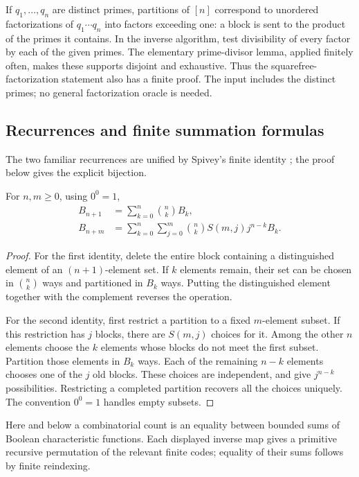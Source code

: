 If $q_1,\ldots,q_n$ are distinct primes, partitions of $[n]$ correspond to
unordered factorizations of $q_1\cdots q_n$ into factors exceeding one: a block
is sent to the product of the primes it contains. In the inverse algorithm,
test divisibility of every factor by each of the given primes. The elementary
prime-divisor lemma, applied finitely often, makes these supports disjoint and
exhaustive. Thus the squarefree-factorization statement also has a finite
proof. The input includes the distinct primes; no general factorization oracle
is needed.

\subsection{Recurrences and finite summation formulas}

The two familiar recurrences are unified by Spivey's finite identity
\cite{spivey}; the proof below gives the explicit bijection.

\begin{theorem}\label{thm:spivey}
For $n,m\geq0$, using $0^0=1$,
\begin{align}
 B_{n+1}&=\sum_{k=0}^{n}\binom nk B_k,\label{eq:bell-binomial}\\
 B_{n+m}&=\sum_{k=0}^{n}\sum_{j=0}^{m}
       \binom nk S(m,j)j^{n-k}B_k.\label{eq:spivey}
\end{align}
\end{theorem}
\begin{proof}
For the first identity, delete the entire block containing a distinguished
element of an $(n+1)$-element set. If $k$ elements remain, their set can be
chosen in $\binom nk$ ways and partitioned in $B_k$ ways. Putting the
distinguished element together with the complement reverses the operation.

For the second identity, first restrict a partition to a fixed $m$-element
subset. If this restriction has $j$ blocks, there are $S(m,j)$ choices for it.
Among the other $n$ elements choose the $k$ elements whose blocks do not meet
the first subset. Partition those elements in $B_k$ ways. Each of the remaining
$n-k$ elements chooses one of the $j$ old blocks. These choices are independent,
and give $j^{n-k}$ possibilities. Restricting a completed partition recovers
all the choices uniquely. The convention $0^0=1$ handles empty subsets.
\end{proof}

Here and below a combinatorial count is an equality between bounded sums of
Boolean characteristic functions. Each displayed inverse map gives a
primitive recursive permutation of the relevant finite codes; equality of
their sums follows by finite reindexing.

